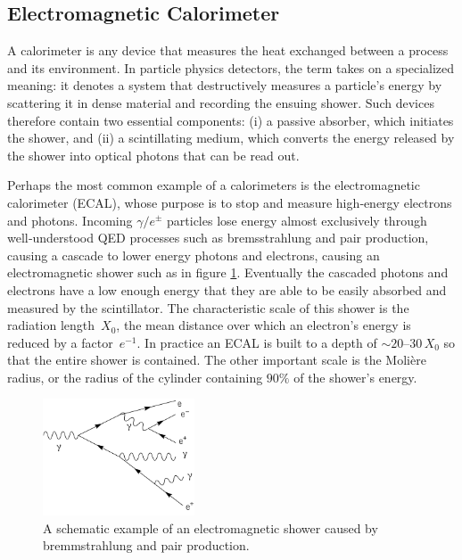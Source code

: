 \subsection{Electromagnetic Calorimeter}
A calorimeter is any device that measures the heat exchanged between a process and its environment.  In particle physics detectors, the term takes on a specialized meaning: it denotes a system that destructively measures a particle’s energy by scattering it in dense material and recording the ensuing shower.  Such devices therefore contain two essential components: (i) a passive absorber, which initiates the shower, and (ii) a scintillating medium, which converts the energy released by the shower into optical photons that can be read out.

Perhaps the most common example of a calorimeters is the electromagnetic calorimeter (ECAL), whose purpose is to stop and measure high‑energy electrons and photons.  Incoming $\gamma/e^{\pm}$ particles lose energy almost exclusively through well‑understood QED processes such as bremsstrahlung and pair production, causing a cascade to lower energy photons and electrons, causing an electromagnetic shower such as in figure \ref{fig:electromagnetic-shower}. Eventually the cascaded photons and electrons have a low enough energy that they are able to be easily absorbed and measured by the scintillator.  The characteristic scale of this shower is the radiation length~$X_{0}$, the mean distance over which an electron’s energy is reduced by a factor~$e^{-1}$.  In practice an ECAL is built to a depth of $\sim\!20$–30\,$X_{0}$ so that the entire shower is contained. The other important scale is the Molière radius, or the radius of the cylinder containing $90\%$ of the shower's energy.

\begin{figure}[htbp]
    \centering
    \includegraphics[width=0.4\textwidth]{figures/chapter3/electromagnetic-shower.png}
    \caption{A schematic example of an electromagnetic shower caused by bremmstrahlung and pair production.}
    \label{fig:electromagnetic-shower}
\end{figure}

